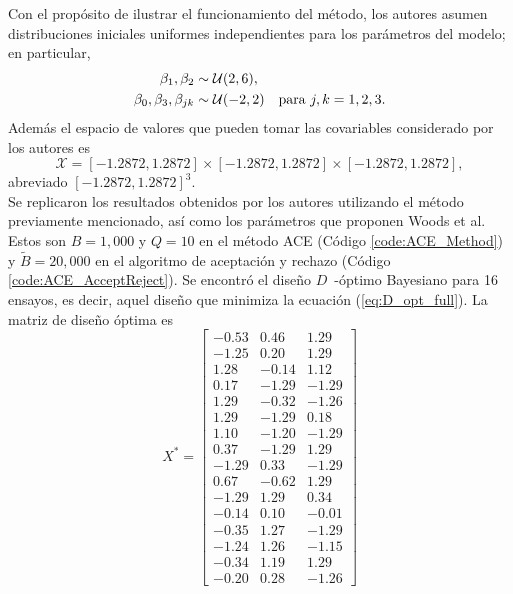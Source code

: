Con el propósito de ilustrar el funcionamiento del método, los autores asumen distribuciones iniciales uniformes independientes para los parámetros del modelo; en particular,
\begin{align} \label{eq:mod1_params_initial}
\begin{split}
	\beta_1, \beta_2 &\sim \mathcal{U} (2, 6), \\
    \beta_0, \beta_3, \beta_{jk} &\sim \mathcal{U} (-2, 2) \quad \text{para } j, k=1,2,3. 
\end{split}
\end{align}
Además el espacio de valores que pueden tomar las covariables considerado por los autores es
\begin{equation*}
	\mathcal{X} = [-1.2872, 1.2872] \times [-1.2872, 1.2872] \times [-1.2872, 1.2872],
\end{equation*}
abreviado $[-1.2872, 1.2872]^3$. \\


Se replicaron los resultados obtenidos por los autores utilizando el método previamente mencionado, así como los parámetros que proponen Woods et al. Estos son $B=1,000$ y $Q = 10$ en el método ACE (Código \ref{code:ACE_Method}) y $\tilde{B} = 20,000$ en el algoritmo de aceptación y rechazo (Código \ref{code:ACE_AcceptReject}). Se encontró el diseño $D$~-óptimo Bayesiano para 16 ensayos, es decir, aquel diseño que minimiza la ecuación (\ref{eq:D_opt_full}). La matriz de diseño óptima es
\begin{equation} \label{eq:logistic_regression_opt_design}
	X^* = \begin{bmatrix}
			   -0.53 &  0.46 &  1.29 \\
			   -1.25 &  0.20 &  1.29 \\
			    1.28 & -0.14 &  1.12 \\
			    0.17 & -1.29 & -1.29 \\
			    1.29 & -0.32 & -1.26 \\
			    1.29 & -1.29 &  0.18 \\
			    1.10 & -1.20 & -1.29 \\
			    0.37 & -1.29 &  1.29 \\
			   -1.29 &  0.33 & -1.29 \\
			    0.67 & -0.62 &  1.29 \\
			   -1.29 &  1.29 &  0.34 \\
			   -0.14 &  0.10 & -0.01 \\
			   -0.35 &  1.27 & -1.29 \\
			   -1.24 &  1.26 & -1.15 \\
			   -0.34 &  1.19 &  1.29 \\
			   -0.20 &  0.28 & -1.26
	      \end{bmatrix}
\end{equation}

